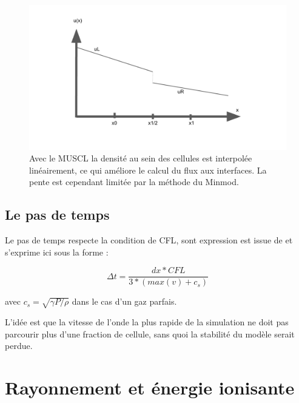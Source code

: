 \begin{figure}
        \includegraphics[width=.95\linewidth]{img/02/MUSCL_minmod.pdf} 
        \caption[Méthode MUSCL]{Avec le \ac{MUSCL} la densité au sein des cellules est interpolée linéairement, ce qui améliore le calcul du flux aux interfaces.
        La pente est cependant limitée par la méthode du Minmod.
 		\label{fig:MUSCL}
 		}
\end{figure}



\subsection{Le pas de temps}
\label{sec:dthydro}

Le pas de temps respecte la condition de \ac{CFL}, sont expression est issue de \cite{teyssier_cosmological_2002} et s'exprime ici sous la forme :

\begin{equation}
\Delta t = \frac{dx * CFL }{3*(max(v) + c_s)}
\end{equation}

avec $c_s = \sqrt{\gamma P/\rho}$ dans le cas d'un gaz parfais.

L'idée est que la vitesse de l'onde la plus rapide de la simulation ne doit pas parcourir plus d'une fraction de cellule, sans quoi la stabilité du modèle serait perdue.


\clearpage
\section{Rayonnement et énergie ionisante}
\label{sec:rad_solver}


